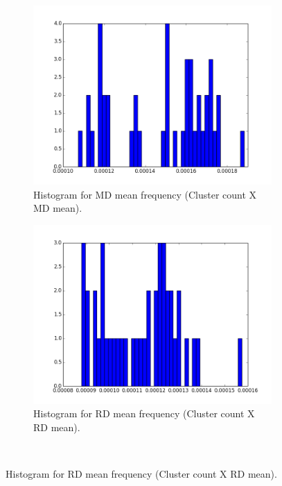 \documentclass[a4paper,11pt]{report}
\begin{document}
\begin{figure}[!ht]
      \begin{subfigure}[t]{.49\textwidth}
        \includegraphics[width=1\linewidth]{img/histograms/fa_clustered_fa_mask_md_means_hist.png}
        \caption{Histogram for MD mean frequency (Cluster count X MD mean).}
        \label{subfig:fa_hist_md}
      \end{subfigure}\hfill%
      \begin{subfigure}[t]{.49\textwidth}
        \includegraphics[width=1\linewidth]{img/histograms/fa_clustered_fa_mask_rd_means_hist.png}
        \caption{Histogram for RD mean frequency (Cluster count X RD mean).}
        \label{subfig:fa_hist_rd}
      \end{subfigure}\hfill\\

\end{figure}
\end{document}
